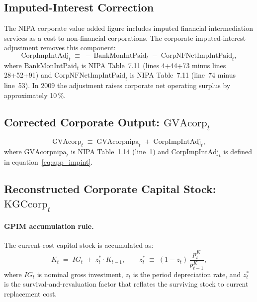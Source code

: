 \documentclass[11pt,a4paper]{article}
\begin{document}

\subsection{Imputed-Interest Correction}

The NIPA corporate value added figure includes imputed financial
intermediation services as a cost to non-financial corporations. The
corporate imputed-interest adjustment removes this component:
%
\begin{equation}
	\label{eq:app_impint}
	\text{CorpImpIntAdj}_t
	\;\equiv\;
	-\,\text{BankMonIntPaid}_t
	\;-\; \text{CorpNFNetImpIntPaid}_t,
\end{equation}
%
where $\text{BankMonIntPaid}_t$ is NIPA Table~7.11
(lines 4+44+73 minus lines 28+52+91) and
$\text{CorpNFNetImpIntPaid}_t$ is NIPA Table~7.11 (line~74 minus line~53).
In 2009 the adjustment raises corporate net operating surplus by
approximately 10\,\%.


\subsection{Corrected Corporate Output: \texorpdfstring{$\text{GVAcorp}_t$}{GVAcorp}}

\begin{equation}
	\label{eq:app_gva}
	\text{GVAcorp}_t
	\;\equiv\;
	\text{GVAcorpnipa}_t \;+\; \text{CorpImpIntAdj}_t,
\end{equation}
%
where $\text{GVAcorpnipa}_t$ is NIPA Table~1.14 (line~1) and
$\text{CorpImpIntAdj}_t$ is defined in equation~\eqref{eq:app_impint}.


\subsection{Reconstructed Corporate Capital Stock: \texorpdfstring{$\text{KGCcorp}_t$}{KGCcorp}}

\paragraph{GPIM accumulation rule.}
The current-cost capital stock is accumulated as:
%
\begin{equation}
	\label{eq:app_gpim}
	K_t \;=\; IG_t \;+\; z_t^* \cdot K_{t-1},
	\qquad
	z_t^* \;\equiv\; (1 - z_t)\,\frac{p^K_t}{p^K_{t-1}},
\end{equation}
%
where $IG_t$ is nominal gross investment, $z_t$ is the period depreciation
rate, and $z_t^*$ is the survival-and-revaluation factor that reflates the
surviving stock to current replacement cost.
\end{document}
